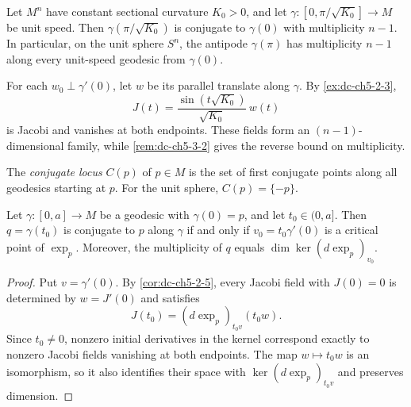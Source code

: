 \begin{example}
  \label{ex:dc-ch5-3-3}
  \leanok
  Let $M^n$ have constant sectional curvature $K_0>0$, and let
  $\gamma:[0,\pi/\sqrt{K_0}]\to M$ be unit speed. Then
  $\gamma(\pi/\sqrt{K_0})$ is conjugate to $\gamma(0)$ with multiplicity $n-1$.
  In particular, on the unit sphere $S^n$, the antipode $\gamma(\pi)$ has
  multiplicity $n-1$ along every unit-speed geodesic from $\gamma(0)$.

  \sketch
  For each $w_0\perp\gamma'(0)$, let $w$ be its parallel translate along
  $\gamma$. By \cref{ex:dc-ch5-2-3},
  $$
  J(t)=\frac{\sin(t\sqrt{K_0})}{\sqrt{K_0}}\,w(t)
  $$
  is Jacobi and vanishes at both endpoints. These fields form an
  $(n-1)$-dimensional family, while \cref{rem:dc-ch5-3-2} gives the reverse
  bound on multiplicity.
\end{example}

\begin{definition}
  \label{def:dc-ch5-3-4}
  The \emph{conjugate locus} $C(p)$ of $p\in M$ is the set of first conjugate
  points along all geodesics starting at $p$. For the unit sphere,
  $C(p)=\{-p\}$.
\end{definition}

\begin{proposition}
  \label{prop:dc-ch5-3-5}
  \leanok
  Let $\gamma:[0,a]\to M$ be a geodesic with $\gamma(0)=p$, and let
  $t_0\in(0,a]$. Then $q=\gamma(t_0)$ is conjugate to $p$ along $\gamma$ if and
  only if $v_0=t_0\gamma'(0)$ is a critical point of $\exp_p$. Moreover, the
  multiplicity of $q$ equals $\dim\ker(d\exp_p)_{v_0}$.
\end{proposition}
\begin{proof}
  \sketch
  Put $v=\gamma'(0)$. By \cref{cor:dc-ch5-2-5}, every Jacobi field with
  $J(0)=0$ is determined by $w=J'(0)$ and satisfies
  $$
  J(t_0)=(d\exp_p)_{t_0v}(t_0w).
  $$
  Since $t_0\ne0$, nonzero initial derivatives in the kernel correspond exactly
  to nonzero Jacobi fields vanishing at both endpoints. The map
  $w\mapsto t_0w$ is an isomorphism, so it also identifies their space with
  $\ker(d\exp_p)_{t_0v}$ and preserves dimension.
\end{proof}

